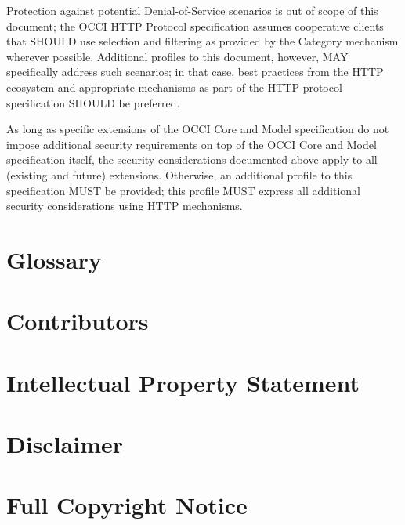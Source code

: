 \documentclass[10pt,a4paper]{article}
\begin{document}
Protection against potential Denial-of-Service scenarios is out of
scope of this document; the OCCI HTTP Protocol specification assumes
cooperative clients that SHOULD use selection and filtering as
provided by the Category mechanism wherever possible. Additional
profiles to this document, however, MAY specifically address such
scenarios; in that case, best practices from the HTTP ecosystem and
appropriate mechanisms as part of the HTTP protocol specification
SHOULD be preferred.

As long as specific extensions of the OCCI Core and Model
specification do not impose additional security requirements on top of the
OCCI Core and Model specification itself, the security considerations
documented above apply to all (existing and future)
extensions. Otherwise, an additional profile to this specification
MUST be provided; this profile MUST express all additional security
considerations using HTTP mechanisms.

\section{Glossary}
\label{sec:glossary}


\section{Contributors}
\label{sec:contrib}


\section{Intellectual Property Statement}
\label{sec:ips}


\section{Disclaimer}
\label{sec:disclaim}


\section{Full Copyright Notice}
\label{sec:copy}




\end{document}
